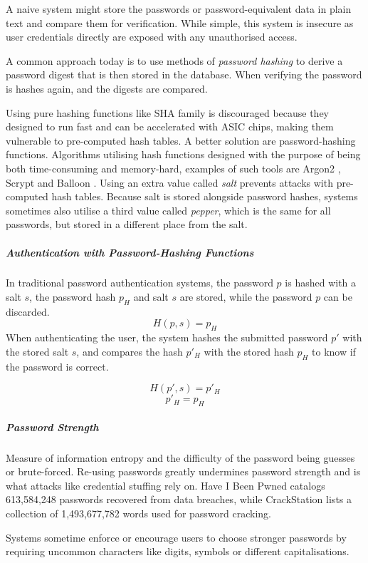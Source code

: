 A naive system might store the passwords or password-equivalent data in plain text and compare them for verification. While simple, this system is insecure as user credentials directly are exposed with any unauthorised access.

A common approach today is to use methods of \textit{password hashing} to derive a password digest that is then stored in the database. 
When verifying the password is hashes again, and the digests are compared.

Using pure hashing functions like SHA family is discouraged because they designed to run fast and can be accelerated with ASIC chips, making them vulnerable to pre-computed hash tables.
A better solution are password-hashing functions. 
Algorithms utilising hash functions designed with the purpose of being both time-consuming and memory-hard, examples of such tools are Argon2 \cite{biryukov2016argon2}, Scrypt \cite{percival2016scrypt} and Balloon \cite{boneh2016balloon}.
Using an extra value called \textit{salt} \cite{hornby2016salted} prevents attacks with pre-computed hash tables.
Because salt is stored alongside password hashes, systems sometimes also utilise a third value called \textit{pepper}, which is the same for all passwords, but stored in a different place from the salt.

\subparagraph{Authentication with Password-Hashing Functions}
\label{paragraph:password-hashing}
In traditional password authentication systems, the password $p$ is hashed with a salt $s$, the password hash $p_H$ and salt $s$ are stored, while the password $p$ can be discarded.
$$H(p, s) = p_H$$
When authenticating the user, the system hashes the submitted password $p'$ with the stored salt $s$, and compares the hash $p{'}_H$ with the stored hash $p_H$ to know if the password is correct.

$$H(p', s) = p{'}_H$$
$$p{'}_H = p_H$$



\subparagraph{Password Strength}
Measure of information entropy and the difficulty of the password being guesses or brute-forced.
Re-using passwords greatly undermines password strength and is what attacks like credential stuffing rely on.
Have I Been Pwned \cite{hunt2021have} catalogs 613,584,248 passwords recovered from data breaches, while CrackStation \cite{hornby2019password} lists a collection of 1,493,677,782 words used for password cracking.

Systems sometime enforce or encourage users to choose stronger passwords by requiring uncommon characters like digits, symbols or different capitalisations.